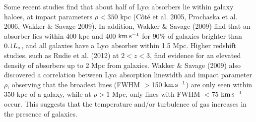\documentclass[iop]{emulateapj-rtx4}
\begin{document}



Some recent studies find that about half of Ly$\alpha$ absorbers lie within galaxy haloes, at impact parameters $\rho<350$ kpc (C\^{o}t\'{e} et al. 2005, Prochaska et al. 2006, Wakker $\&$ Savage 2009). In addition, Wakker $\&$ Savage (2009) find that an absorber lies within 400 kpc and 400 $\rm km\, s^{-1}$ for $90\%$ of galaxies brighter than $0.1L_{\**}$, and all galaxies have a Ly$\alpha$ absorber within 1.5 Mpc. Higher redshift studies, such as Rudie et al. (2012) at $2<z<3$, find evidence for an elevated density of absorbers up to 2 Mpc from galaxies. Wakker $\&$ Savage (2009) also discovered a correlation between Ly$\alpha$ absorption linewidth and impact parameter $\rho$, observing that the broadest lines (FWHM $>$150 $\rm km\, s^{-1}$) are only seen within 350 kpc of a galaxy, while at $\rho>1$ Mpc, only lines with FWHM $<75$ $\rm km\, s^{-1}$ occur. This suggests that the temperature and/or turbulence of gas increases in the presence of galaxies.
\end{document}
